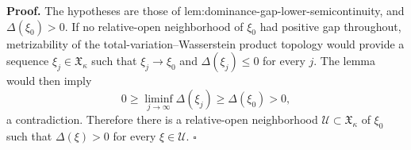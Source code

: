 \textbf{Proof.}
The hypotheses are those of lem:dominance-gap-lower-semicontinuity, and \(\Delta(\xi_0)>0\).  If no relative-open neighborhood of \(\xi_0\) had positive gap throughout, metrizability of the total-variation--Wasserstein product topology would provide a sequence \(\xi_j\in\mathfrak X_\kappa\) such that \(\xi_j\to\xi_0\) and \(\Delta(\xi_j)\le0\) for every \(j\).  The lemma would then imply
\[
0\ge\liminf_{j\to\infty}\Delta(\xi_j)
\ge\Delta(\xi_0)>0,
\]
a contradiction.  Therefore there is a relative-open neighborhood \(\mathcal U\subset\mathfrak X_\kappa\) of \(\xi_0\) such that \(\Delta(\xi)>0\) for every \(\xi\in\mathcal U\). \(\square\)